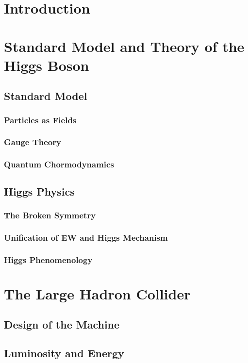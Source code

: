 \chapter{Introduction}
\chapter{Standard Model and Theory of the Higgs Boson}
\section{Standard Model}
\subsection{Particles as Fields}
\subsection{Gauge Theory}
\subsection{Quantum Chormodynamics}

\section{Higgs Physics}
\subsection{The Broken Symmetry}
\subsection{Unification of EW and Higgs Mechanism}
\subsection{Higgs Phenomenology}

\chapter{The Large Hadron Collider}
\section{Design of the Machine}
\section{Luminosity and Energy}

